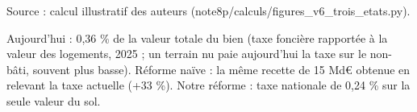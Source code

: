Source : calcul illustratif des auteurs (note8p/calculs/figures\_v6\_trois\_etats.py).\par Aujourd'hui : 0,36 \% de la valeur totale du bien (taxe foncière rapportée à la valeur des logements, 2025 ; un terrain nu paie aujourd'hui la taxe sur le non-bâti, souvent plus basse). Réforme naïve : la même recette de 15 Md€ obtenue en relevant la taxe actuelle (+33 \%). Notre réforme : taxe nationale de 0,24 \% sur la seule valeur du sol.
